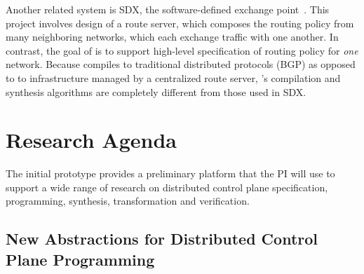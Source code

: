 Another related system is SDX, the software-defined exchange 
point~\cite{sdx,isdx}. This project involves design of a route server, which 
composes the routing policy from
many neighboring networks, which each exchange traffic
with one another.
In contrast, the goal of \Name is to support high-level 
specification of routing policy for \emph{one}
network.  Because
\Name compiles to traditional distributed protocols (BGP) as opposed to
to infrastructure managed by a centralized route server, 
\Name's compilation and synthesis algorithms
are completely different from those used in SDX.




\section{Research Agenda}
\label{sec:research}

The initial \Name prototype provides a preliminary platform that
the PI will use to support a wide range of research on distributed control
plane specification, programming, synthesis, transformation and verification.

\subsection{New Abstractions for Distributed Control Plane Programming}

